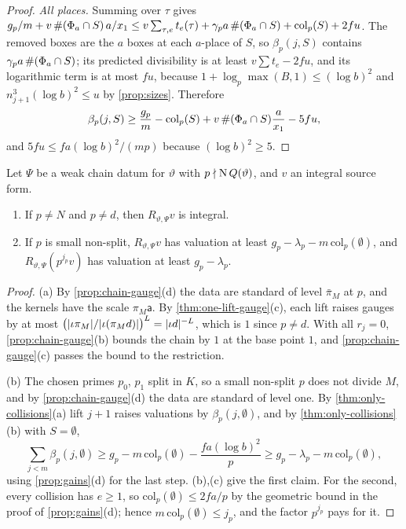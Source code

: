 \begin{proof}
\emph{All places.} Summing over $\tau$ gives $g_p/m+v\,\#(\Phi_a\cap S)\,a/x_1\le v\sum_{\tau,e}t_e(\tau)+\gamma_pa\,\#(\Phi_a\cap S)+\mathrm{col}_p(S)+2fu$. The removed boxes are the $a$ boxes at each $a$-place of $S$, so $\beta_p(j,S)$ contains $\gamma_pa\,\#(\Phi_a\cap S)$; its predicted divisibility is at least $v\sum t_e-2fu$, and its
logarithmic term is at most $fu$, because $1+\log_p\max(B,1)\le(\log b)^2$ and $n_{j+1}^3(\log b)^2\le u$ by \cref{prop:sizes}. Therefore
\[
  \beta_p(j,S)\ge\frac{g_p}m-\mathrm{col}_p(S)+v\,\#(\Phi_a\cap S)\frac a{x_1}-5fu ,
\]
and $5fu\le fa(\log b)^2/(mp)$ because $(\log b)^2\ge5$.
\end{proof}

\begin{proposition}\label{prop:nonexceptional}
Let $\Psi$ be a weak chain datum for $\vartheta$ with $p\nmid\operatorname{N} Q(\vartheta)$, and $v$ an integral source form.
\begin{enumerate}[label=\textup{(\alph*)}]
\item If $p\ne N$ and $p\ne d$, then $R_{\vartheta,\Psi}v$ is integral.
\item If $p$ is small non-split, $R_{\vartheta,\Psi}v$ has valuation at least $g_p-\lambda_p-m\,\mathrm{col}_p(\emptyset)$, and
$R_{\vartheta,\Psi}(p^{j_p}v)$ has valuation at least $g_p-\lambda_p$.
\end{enumerate}
\end{proposition}

\begin{proof}
(a) By \cref{prop:chain-gauge}(d) the data are standard of level $\bar\pi_M$ at $p$, and the kernels have the scale $\pi_M\mathsf a$. By \cref{thm:one-lift-gauge}(c), each lift raises gauges by at most $\bigl(\lvert \iota\pi_M\rvert/\lvert \iota(\pi_Md)\rvert\bigr)^L=\lvert \iota d\rvert^{-L}$, which is $1$ since $p\ne d$. With all $r_j=0$, \cref{prop:chain-gauge}(b) bounds the chain by $1$ at the base point $1$,
and \cref{prop:chain-gauge}(c) passes the bound to the restriction.

(b) The chosen primes $p_0$, $p_1$ split in $K$, so a small non-split $p$ does not divide $M$, and by \cref{prop:chain-gauge}(d) the data are standard of level one. By \cref{thm:only-collisions}(a) lift $j+1$ raises valuations by $\beta_p(j,\emptyset)$, and by \cref{thm:only-collisions}(b) with $S=\emptyset$,
\[
  \sum_{j<m}\beta_p(j,\emptyset)\ge g_p-m\,\mathrm{col}_p(\emptyset)-\frac{fa(\log b)^2}p\ge g_p-\lambda_p-m\,\mathrm{col}_p(\emptyset),
\]
using \cref{prop:gains}(d) for the last step. (b),(c) give the first claim. For the second, every collision has $e\ge1$, so $\mathrm{col}_p(\emptyset)\le2fa/p$ by the geometric bound in the proof of \cref{prop:gains}(d); hence $m\,\mathrm{col}_p(\emptyset)\le j_p$, and the factor $p^{j_p}$ pays for it.
\end{proof}


